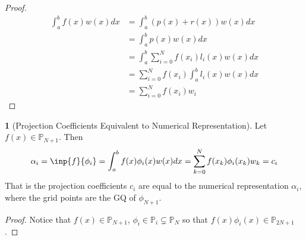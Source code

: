 \documentclass[12pt]{article}
\theoremstyle{definition}
\newtheorem{theorem}{\color{ForestGreen}{\textbf{Theorem}}}
\theoremstyle{definition}
\begin{document}
\begin{proof}
 	\begin{align*}
 		\int_{a}^b f(x) w(x) dx &= \int_a^b (p(x) + r(x))w(x)dx \\
 		&= \int_a^b p(x)w(x) dx \tag{since $\int_a^b r(x)w(x)dx=0$} \\
 		&= \int_a^b \sum_{i=0}^{N} f(x_i)l_i(x) w(x) dx \\
 		&= \sum_{i=0}^{N} f(x_i) \int_a^b l_i(x) w(x) dx \\
 		&= \sum_{i=0}^{N} f(x_i) w_i
 	\end{align*}
\end{proof}

\begin{theorem}[Projection Coefficients Equivalent to Numerical Representation]
	Let $f(x) \in \mathbb{P}_{N+1}$. Then 
	\begin{equation}
		\alpha_i = \inp{f}{\phi_i} = \int_a^b f(x)\phi_i(x)w(x)dx = \sum_{k=0}^N f(x_k)\phi_i(x_k)w_k = c_i
	\end{equation}
	That is the projection coefficients $c_i$ are equal to the numerical representation $\alpha_i$, where the grid points are the GQ of $\phi_{N+1}$.
\end{theorem}
\begin{proof}
	Notice that $f(x) \in \mathbb{P}_{N+1}$, $\phi_i \in \mathbb{P}_{i} \subsetneq \mathbb{P}_N$ so that $ f(x)\phi_i(x) \in \mathbb{P}_{2N+1}$.
\end{proof}
\end{document}
